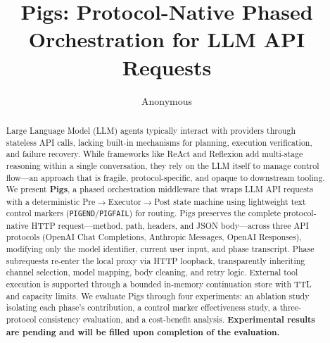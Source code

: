 \documentclass[10pt]{article}
\title{Pigs: Protocol-Native Phased Orchestration for LLM API Requests}
\author{Anonymous}
\date{}
\begin{document}
\maketitle

\begin{abstract}
Large Language Model (LLM) agents typically interact with providers through stateless API calls, lacking built-in mechanisms for planning, execution verification, and failure recovery. While frameworks like ReAct and Reflexion add multi-stage reasoning within a single conversation, they rely on the LLM itself to manage control flow---an approach that is fragile, protocol-specific, and opaque to downstream tooling. We present \textbf{Pigs}, a phased orchestration middleware that wraps LLM API requests with a deterministic Pre$\rightarrow$Executor$\rightarrow$Post state machine using lightweight text control markers (\texttt{PIGEND}/\texttt{PIGFAIL}) for routing. Pigs preserves the complete protocol-native HTTP request---method, path, headers, and JSON body---across three API protocols (OpenAI Chat Completions, Anthropic Messages, OpenAI Responses), modifying only the model identifier, current user input, and phase transcript. Phase subrequests re-enter the local proxy via HTTP loopback, transparently inheriting channel selection, model mapping, body cleaning, and retry logic. External tool execution is supported through a bounded in-memory continuation store with TTL and capacity limits. We evaluate Pigs through four experiments: an ablation study isolating each phase's contribution, a control marker effectiveness study, a three-protocol consistency evaluation, and a cost-benefit analysis. \textbf{Experimental results are pending and will be filled upon completion of the evaluation.}
\end{abstract}













\end{document}
